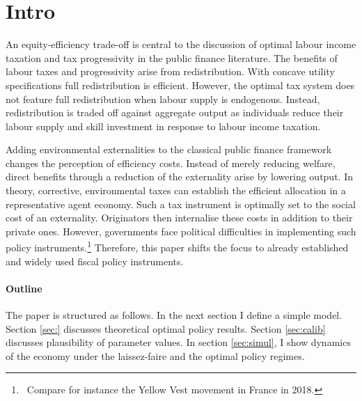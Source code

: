 \section{Intro}

An equity-efficiency trade-off is central to the discussion of optimal labour income taxation and tax progressivity in the public finance literature.  The benefits of labour taxes and progressivity arise from redistribution. With concave utility specifications full redistribution is efficient. However, the optimal tax system does not feature full redistribution when labour supply is endogenous. Instead, redistribution is traded off against aggregate output as individuals reduce their labour supply and skill investment in response to labour income taxation. 

Adding environmental externalities to the classical public finance framework changes the perception of efficiency costs. Instead of merely reducing welfare, direct benefits through a reduction of the externality arise by lowering output. 
In theory, corrective, environmental taxes can establish the efficient allocation in a representative agent economy. Such a tax instrument is optimally set to the social cost of an externality. Originators then internalise these costs in addition to their private ones. However, governments face political difficulties in implementing such policy instruments.\footnote{\ Compare for instance the Yellow Vest movement in France in 2018.} Therefore, this paper shifts the focus to already established and widely used fiscal policy instruments. 


\paragraph{Outline}
The paper is structured as follows. In the next section I define a simple model.%
Section \ref{sec:} discusses theoretical optimal policy results. Section \ref{sec:calib} discusses plausibility of parameter values. In section \ref{sec:simul}, I show dynamics of the economy under the laissez-faire and the optimal policy regimes. 


